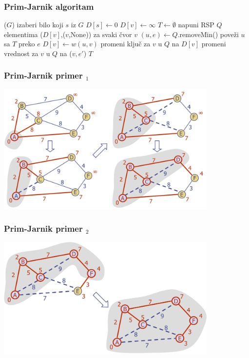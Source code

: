 \documentclass[compress,aspectratio=169]{beamer}
\begin{document}
\begin{frame}[fragile,shrink=2]
  \frametitle{Prim-Jarnik algoritam}
  \begin{algorithmic}
    \STATE {}($G$)
    \STATE izaberi bilo koji $s$ iz $G$
    \STATE $D[s] \leftarrow 0$
      \STATE $D[v] \leftarrow \infty$
    \ENDFOR
    \STATE $T \leftarrow \emptyset$
    \STATE napuni RSP $Q$ elementima ($D[v]$,($v$,None)) za svaki čvor $v$
      \STATE $(u,e) \leftarrow Q$.removeMin()
      \STATE poveži $u$ sa $T$ preko $e$
        \STATE {}
          \STATE $D[v] \leftarrow w(u,v)$
          \STATE promeni ključ za $v$ u $Q$ na $D[v]$
          \STATE promeni vrednost za $v$ u $Q$ na ($v,e'$)
        \ENDIF
      \ENDFOR
    \ENDWHILE
    \RETURN $T$
  \end{algorithmic}
\end{frame}

\begin{frame}[fragile]
  \frametitle{Prim-Jarnik primer $_1$}
  \begin{center}
    \includegraphics[width=11cm]{asp-14-pic72.png}
  \end{center}
\end{frame}

\begin{frame}[fragile]
  \frametitle{Prim-Jarnik primer $_2$}
  \begin{center}
    \includegraphics[width=11cm]{asp-14-pic73.png}
  \end{center}
\end{frame}
\end{document}
